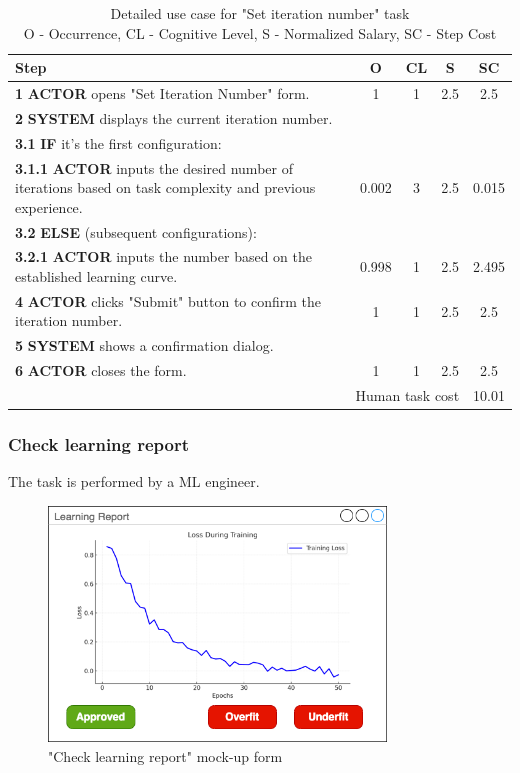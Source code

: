 \begin{table}[H]
\centering
\begin{tabularx}{\textwidth}{|X|c|c|c|c|}
\hline
\textbf{Step} & \textbf{O} & \textbf{CL} & \textbf{S} & \textbf{SC} \\
\hline
\textbf{1} \textbf{ACTOR} opens "Set Iteration Number" form. & 1 & 1 & 2.5 & 2.5 \\
\hline
\textbf{2} \textbf{SYSTEM} displays the current iteration number. & & & & \\
\hline
\textbf{3.1} \textbf {IF} it's the first configuration: &  &  &  & \\
\hline
\textbf{3.1.1} \textbf {ACTOR} inputs the desired number of iterations based on task complexity and previous experience. & 0.002 & 3 & 2.5 & 0.015 \\
\hline
\textbf{3.2} \textbf {ELSE} (subsequent configurations): & & & & \\
\hline
\textbf{3.2.1} \textbf{ACTOR} inputs the number based on the established learning curve. & 0.998 & 1 & 2.5 & 2.495 \\
\hline
\textbf{4} \textbf{ACTOR} clicks "Submit" button to confirm the iteration number. & 1 & 1 & 2.5 & 2.5 \\
\hline
\textbf{5} \textbf{SYSTEM} shows a confirmation dialog. & & & & \\
\hline
\textbf{6} \textbf{ACTOR} closes the form. & 1 & 1 & 2.5 & 2.5 \\
\hline
\multicolumn{4}{|r|}{Human task cost} & 10.01\\
\hline
\end{tabularx}
\caption{Detailed use case for "Set iteration number" task\\ 
O - Occurrence, CL - Cognitive Level, S - Normalized Salary, SC - Step Cost}
\label{table:set_iteration_number}
\end{table}

\subsubsection{Check learning report}

The task is performed by a ML engineer.

\begin{figure}[H]
\centering
\includegraphics[width=0.8\textwidth]{figures/check_learning_report.png}
\caption{"Check learning report" mock-up form}
\end{figure}

